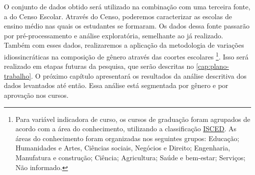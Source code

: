 O conjunto de dados obtido será utilizado na combinação com uma terceira fonte, a do Censo Escolar. Através do Censo, poderemos caracterizar as escolas de ensino médio nas quais os estudantes se formaram. Os dados dessa fonte passarão por pré-processamento e análise exploratória, semelhante ao já realizado. Também com esses dados, realizaremos a aplicação da metodologia de variações idiossincráticas na composição de gênero através das coortes escolares \footnote{Para variável indicadora de curso, os cursos de graduação foram agrupados de acordo com a área do conhecimento, utilizando a classificação 
\href{https://uis.unesco.org/sites/default/files/documents/international-standard-classification-of-education-isced-2011-en.pdf}{ISCED}. As áreas do conhecimento foram organizadas nos seguintes grupos: Educação; Humanidades e Artes, Ciências sociais, Negócios e Direito; Engenharia, Manufatura e construção; Ciência; Agricultura; Saúde e bem-estar; Serviços; Não informado.}. Isso será realizado em etapas futuras da pesquisa, que serão descritas no \autoref{cap:plano-trabalho}. O próximo capítulo apresentará os resultados da análise descritiva dos dados levantados até então. Essa análise está segmentada por gênero e por aprovação nos cursos.
